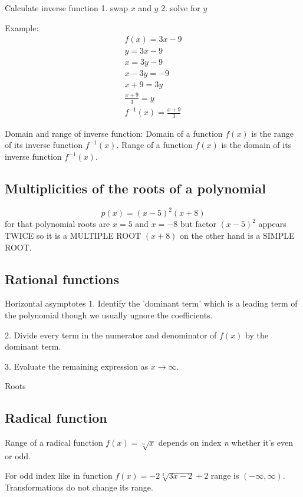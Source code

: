 \documentclass{article}
\begin{document}
Calculate inverse function
1. swap $x$ and $y$
2. solve for $y$

Example:
\begin{equation}
  \begin{gathered}
    f(x) = 3x-9 \\
    y = 3x-9 \\
    x = 3y-9 \\
    x-3y=-9 \\
    x+9=3y \\
    \frac{x+9}{3}=y \\
    f^{-1}(x)=\frac{x+9}{3}
  \end{gathered}
\end{equation}

Domain and range of inverse function:
Domain of a function $f(x)$ is the range of its inverse function $f^{-1}(x)$.
Range of a function $f(x)$ is the domain of its inverse function $f^{-1}(x)$.

\subsection{Multiplicities of the roots of a polynomial}
\begin{equation}
  p(x) = (x-5)^2(x+8)
\end{equation}
for that polynomial roots are $x=5$ and $x=-8$ but factor $(x-5)^2$
appears TWICE so it is a MULTIPLE ROOT
$(x+8)$ on the other hand is a SIMPLE ROOT.



\subsection{Rational functions}
Horizontal asymptotes
1. Identify the 'dominant term' which is a leading term of the polynomial though we
usually ugnore the coefficients.

2. Divide every term in the numerator and denominator of $f(x)$ by the dominant term.

3. Evaluate the remaining expression as $x \to \infty$.


Roots


\subsection{Radical function}
Range of a radical function $f(x) = \sqrt[n]{x}$ depends on index \textit{n} whether it's even or odd.

For odd index like in function $f(x) = -2\sqrt[3]{3x-2}+2$ range is $(-\infty, \infty)$.
Transformations do not change its range.
\end{document}
